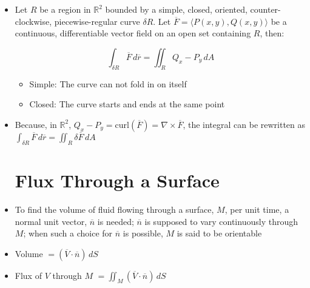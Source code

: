 \begin{itemize}
  \item Let $R$ be a region in $\mathbb{R}^2$ bounded by a simple, closed, oriented, counter-clockwise, piecewise-regular curve $\delta R$. Let $\overline{F}=\langle P(x,y), Q(x,y) \rangle$ be a continuous, differentiable vector field on an open set containing $R$, then:

    $$\int_{\delta R} \overline{F}\,d\overline{r}=\iint_R Q_x-P_y\,dA$$

    \begin{itemize}

      \item Simple: The curve can not fold in on itself

      \item Closed: The curve starts and ends at the same point

    \end{itemize}

  \item Because, in $\mathbb{R}^2$, $Q_x-P_y=\text{curl}(\overline{F})=\nabla \times \overline{F}$, the integral can be rewritten as $\displaystyle \int_{\delta R}\overline{F}\,d\overline{r}=\iint_R\delta\overline{F}\,dA$

    \section{Flux Through a Surface}

  \item To find the volume of fluid flowing through a surface, $M$, per unit time, a normal unit vector, $\overline{n}$ is needed; $\overline{n}$ is supposed to vary continuously through $M$; when such a choice for $\overline{n}$ is possible, $M$ is said to be orientable

  \item Volume $=(\overline{V}\cdot\overline{n})\,dS$

  \item Flux of $V$ through $M$ $=\displaystyle\iint_M (\overline{V}\cdot\overline{n})\,dS$

\end{itemize}



